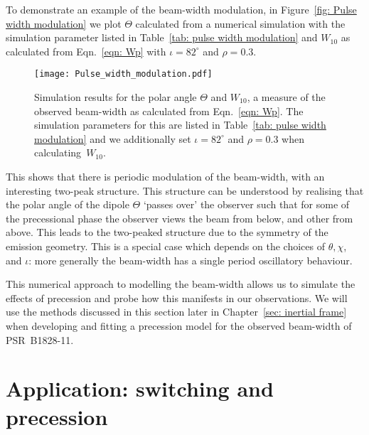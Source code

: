 \documentclass[../full_thesis/full_thesis.tex]{subfiles}
\newcommand{\thisdir}{../inertial_frame}
\begin{document}
To demonstrate an example of the beam-width modulation, in Figure~\ref{fig: Pulse width
modulation} we plot $\Theta$ calculated from a numerical simulation with the
simulation parameter listed in Table~\ref{tab: pulse width modulation} and
$W_{10}$ as calculated from Eqn.~\eqref{eqn: Wp} with $\iota=82^{\circ}$ and
$\rho=0.3$.

\begin{table}[htb]
\centering

\caption{Simulation parameters for the beam-width modulations plotted in
Figure~\ref{fig: Pulse width modulation}.}
\label{tab: pulse width modulation}
\end{table}

\begin{figure}[ht]
\centering
\texttt{[image: Pulse\_width\_modulation.pdf]}
\caption{Simulation results for the polar angle $\Theta$ and $W_{10}$, a
measure of the observed beam-width as calculated from Eqn.~\eqref{eqn: Wp}.
The simulation parameters for this are listed in Table~\ref{tab: pulse width modulation}
and we additionally set $\iota=82^{\circ}$ and $\rho=0.3$ when calculating~$W_{10}$.}
\label{fig: Pulse width modulation}
\end{figure}


This shows that there is periodic modulation of the beam-width, with an
interesting two-peak structure. This structure can be understood by realising
that the polar angle of the dipole $\Theta$ `passes over' the observer such
that for some of the precessional phase the observer views the beam from below,
and other from above. This leads to the two-peaked structure due to the
symmetry of the emission geometry. This is a special case which depends on
the choices of $\theta, \chi$, and $\iota$: more generally the beam-width has
a single period oscillatory behaviour.

This numerical approach to modelling the beam-width allows us to simulate the
effects of precession and probe how this manifests in our observations.  We
will use the methods discussed in this section later in Chapter~\ref{sec:
inertial frame} when developing and fitting a precession model for the
observed beam-width of PSR~B1828-11.


\section{Application: switching and precession}
\label{sec: application switching and precession}
\end{document}
